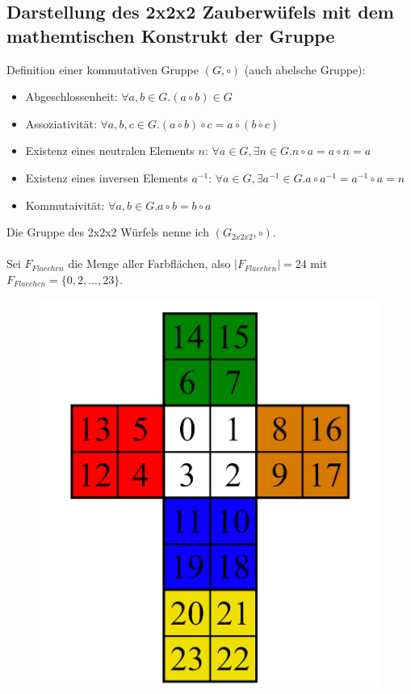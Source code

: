 \documentclass[12pt,a4paper, usenames, dvipsnames]{scrartcl}
\begin{document}
\subsection*{Darstellung des 2x2x2 Zauberwüfels mit dem mathemtischen Konstrukt der Gruppe}
Definition einer kommutativen Gruppe $(G, \circ)$ (auch abelsche Gruppe):
\begin{itemize}
\item Abgeschlossenheit: $\forall a,b \in G.(a \circ b) \in G $
\item Assoziativität: $\forall a,b,c \in G.(a \circ b) \circ c = a \circ (b \circ c)$
\item Existenz eines neutralen Elements $n$: $\forall a \in G, \exists n \in G.n \circ a = a \circ n = a$ 
\item Existenz eines inversen Elements $a^{-1}$: $\forall a \in G, \exists a^{-1} \in G. a \circ a^{-1} = a^{-1} \circ a = n$ 
\item Kommutaivität: $\forall a,b \in G.a \circ b = b \circ a$
\end{itemize}
Die Gruppe des 2x2x2 Würfels nenne ich $(G_{2x2x2}, \circ)$. \\
\\
Sei $F_{Flaechen}$ die Menge aller Farbflächen, also $|F_{Flaechen}|=24$ mit $F_{Flaechen} = \lbrace 0, 2, ..., 23\rbrace$.
\\
\begin{figure}[h]
\centering
\includegraphics[scale=0.1]{2x2foldedout.png}
\end{figure}
\end{document}
